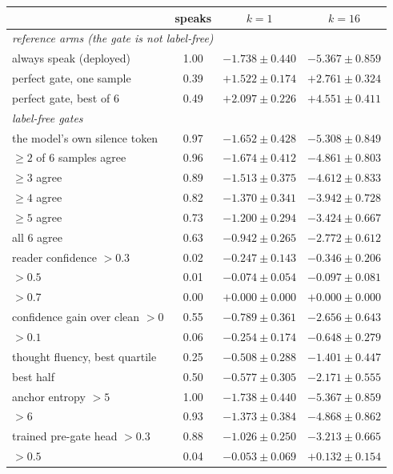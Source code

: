 \documentclass{article} %
\begin{document}
\begin{table}[t]
\centering\small
\begin{tabular}{lccc}
\toprule
 & speaks & $k{=}1$ & $k{=}16$ \\
\midrule
\multicolumn{4}{l}{\emph{reference arms (the gate is not label-free)}}\\
always speak (deployed) & 1.00 & $-1.738 \pm 0.440$ & $-5.367 \pm 0.859$ \\
perfect gate, one sample & 0.39 & $+1.522 \pm 0.174$ & $+2.761 \pm 0.324$ \\
perfect gate, best of $6$ & 0.49 & $+2.097 \pm 0.226$ & $+4.551 \pm 0.411$ \\
\midrule
\multicolumn{4}{l}{\emph{label-free gates}}\\
the model's own silence token & 0.97 & $-1.652 \pm 0.428$ & $-5.308 \pm 0.849$ \\
$\geq 2$ of $6$ samples agree & 0.96 & $-1.674 \pm 0.412$ & $-4.861 \pm 0.803$ \\
$\geq 3$ agree & 0.89 & $-1.513 \pm 0.375$ & $-4.612 \pm 0.833$ \\
$\geq 4$ agree & 0.82 & $-1.370 \pm 0.341$ & $-3.942 \pm 0.728$ \\
$\geq 5$ agree & 0.73 & $-1.200 \pm 0.294$ & $-3.424 \pm 0.667$ \\
all $6$ agree & 0.63 & $-0.942 \pm 0.265$ & $-2.772 \pm 0.612$ \\
reader confidence $>0.3$ & 0.02 & $-0.247 \pm 0.143$ & $-0.346 \pm 0.206$ \\
\quad $>0.5$ & 0.01 & $-0.074 \pm 0.054$ & $-0.097 \pm 0.081$ \\
\quad $>0.7$ & 0.00 & $+0.000 \pm 0.000$ & $+0.000 \pm 0.000$ \\
confidence gain over clean $>0$ & 0.55 & $-0.789 \pm 0.361$ & $-2.656 \pm 0.643$ \\
\quad $>0.1$ & 0.06 & $-0.254 \pm 0.174$ & $-0.648 \pm 0.279$ \\
thought fluency, best quartile & 0.25 & $-0.508 \pm 0.288$ & $-1.401 \pm 0.447$ \\
\quad best half & 0.50 & $-0.577 \pm 0.305$ & $-2.171 \pm 0.555$ \\
anchor entropy $>5$ & 1.00 & $-1.738 \pm 0.440$ & $-5.367 \pm 0.859$ \\
\quad $>6$ & 0.93 & $-1.373 \pm 0.384$ & $-4.868 \pm 0.862$ \\
trained pre-gate head $>0.3$ & 0.88 & $-1.026 \pm 0.250$ & $-3.213 \pm 0.665$ \\
\quad $>0.5$ & 0.04 & $-0.053 \pm 0.069$ & $+0.132 \pm 0.154$ \\

\end{tabular}
\end{table}
\end{document}
